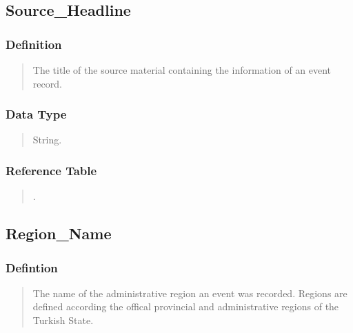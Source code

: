 \documentclass[letterpaper,10pt,english]{sphinxmanual}
\begin{document}
\subsection{Source\_Headline}
\label{\detokenize{schema_tables:source-headline}}

\subsubsection{Definition}
\label{\detokenize{schema_tables:id20}}\begin{quote}

\sphinxAtStartPar
The title of the source material containing the information of an event record.
\end{quote}


\subsubsection{Data Type}
\label{\detokenize{schema_tables:id21}}\begin{quote}

\sphinxAtStartPar
String.
\end{quote}


\subsubsection{Reference Table}
\label{\detokenize{schema_tables:id22}}\begin{quote}

\sphinxAtStartPar
{\hyperref[\detokenize{schema_tables:overview-table}]{}}.
\end{quote}


\subsection{Region\_Name}
\label{\detokenize{schema_tables:region-name}}

\subsubsection{Defintion}
\label{\detokenize{schema_tables:defintion}}\begin{quote}

\sphinxAtStartPar
The name of the administrative region an event was recorded.  Regions are defined according the offical provincial and administrative regions of the Turkish State.
\end{quote}
\end{document}
